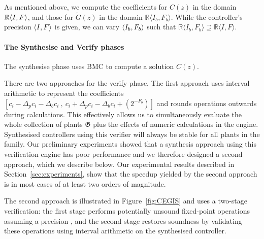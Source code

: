 \documentclass{sig-alternate-05-2015}
\begin{document}
As mentioned above, we compute the coefficients for $C(z)$ 
in the domain $\mathbb{R}\langle{I},{F}\rangle$, 
and those for $\tilde G(z)$ in the domain
$\mathbb{R}\langle I_b,F_b \rangle$.
While the controller's precision $\langle{I},{F}\rangle$ is given, 
we can vary $\langle{I_b},{F_b}\rangle$ such that 
$\mathbb{R}\langle I_b,F_b \rangle \supseteq \mathbb{R}\langle I,F \rangle$.

\paragraph{The {\sc Synthesise} and {\sc Verify} phases}
The {\sc synthesise} phase uses BMC to 
compute a solution $C(z)$. %

There are two approaches for the {\sc verify} phase.
The first approach uses interval arithmetic \cite{moore1966interval}
to represent the coefficients
$[{c}_i-\Delta_p{c}_i-\Delta_b{c}_i\ ,\
{c}_i+\Delta_p{c}_i-\Delta_b{c}_i+(2^{-F_b})]$ 
and rounds operations outwards during calculations. This effectively allows
us to simultaneously evaluate the whole collection of plants $\mathfrak{G}$
plus the effects of numeric calculations in the engine.
Synthesised controllers using this verifier will always
be stable for all plants in the family.
Our preliminary experiments showed that a synthesis approach
using this verification engine has poor performance and we
therefore designed a second approach, which we describe below.
Our experimental results described in Section~\ref{sec:experiments}, 
show that the speedup yielded by the second approach 
is in most cases of at least two orders of magnitude.

The second approach is illustrated in Figure~\ref{fig:CEGIS} and uses a
two-stage verification: the first stage performs potentially unsound
fixed-point operations assuming a precision \param{I_b}{F_b}, and the
second stage restores soundness by validating these operations
using interval arithmetic on the synthesised controller.
\end{document}
